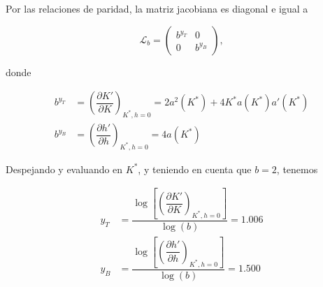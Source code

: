 \documentclass[10pt]{article}
\begin{document}
Por las relaciones de paridad, la matriz jacobiana es diagonal e igual a 

$$
\mathcal{L}_b = 
\begin{pmatrix}
b^{y_T} & 0 \\
0 & b^{y_B}
\end{pmatrix},
$$

donde

\begin{align}
b^{y_T} &= \left( \dfrac{\partial K'}{\partial K} \right)_{K^{*},h=0} = 2a^2(K^*)+4K^*a(K^*) a'(K^*) \\
b^{y_B} &= \left( \dfrac{\partial h'}{\partial h} \right)_{K^{*},h=0} = 4a(K^*)
\end{align}

Despejando y evaluando en $K^*$, y teniendo en cuenta que $b=2$, tenemos

\begin{align}
y_T &= \dfrac{\log\left[ \left( \dfrac{\partial K'}{\partial K}  \right)_{K^{*},h=0} \right]}{\log(b)} = 1.006 \\
y_B &= \dfrac{\log\left[ \left( \dfrac{\partial h'}{\partial h}  \right)_{K^{*},h=0} \right]}{\log(b)} = 1.500
\end{align}
\end{document}
